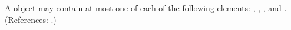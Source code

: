 A \Reaction object may contain at most one of each of the following
elements: , ,
, and .  (References: .)
